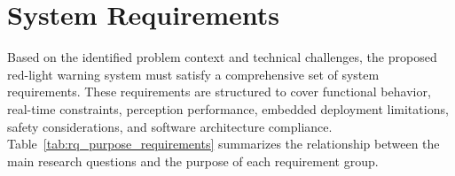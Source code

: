 



\section{System Requirements}

Based on the identified problem context and technical challenges, the proposed red-light warning system must satisfy a comprehensive set of system requirements. These requirements are structured to cover functional behavior, real-time constraints, perception performance, embedded deployment limitations, safety considerations, and software architecture compliance. Table~\ref{tab:rq_purpose_requirements} summarizes the relationship between the main research questions and the purpose of each requirement group.


